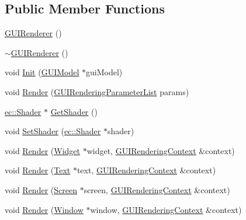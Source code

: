 \subsection*{Public Member Functions}
\begin{DoxyCompactItemize}
\item 
\mbox{\hyperlink{classec__gui_1_1_g_u_i_renderer_ae4a4377643f0c1779ca5eb235d28c6d6}{G\+U\+I\+Renderer}} ()
\item 
\mbox{\hyperlink{classec__gui_1_1_g_u_i_renderer_a91a3b6556e43f46fbb331004a6c2bd6a}{$\sim$\+G\+U\+I\+Renderer}} ()
\item 
void \mbox{\hyperlink{classec__gui_1_1_g_u_i_renderer_acc450ad133730bae2e9cc39bf5565a63}{Init}} (\mbox{\hyperlink{classec__gui_1_1_g_u_i_model}{G\+U\+I\+Model}} $\ast$gui\+Model)
\item 
void \mbox{\hyperlink{classec__gui_1_1_g_u_i_renderer_a92e0ffad2a4d6f749f764af78f6965d6}{Render}} (\mbox{\hyperlink{structec__gui_1_1_g_u_i_rendering_parameter_list}{G\+U\+I\+Rendering\+Parameter\+List}} params)
\item 
\mbox{\hyperlink{classec_1_1_shader}{ec\+::\+Shader}} $\ast$ \mbox{\hyperlink{classec__gui_1_1_g_u_i_renderer_a3a76769e5dd89331afb899cb7c595883}{Get\+Shader}} ()
\item 
void \mbox{\hyperlink{classec__gui_1_1_g_u_i_renderer_a12195634fd49c0475ee798cdb1d474c0}{Set\+Shader}} (\mbox{\hyperlink{classec_1_1_shader}{ec\+::\+Shader}} $\ast$shader)
\item 
void \mbox{\hyperlink{classec__gui_1_1_g_u_i_renderer_a31787542322b95eecabed8b90e3e0912}{Render}} (\mbox{\hyperlink{classec__gui_1_1_widget}{Widget}} $\ast$widget, \mbox{\hyperlink{classec__gui_1_1_g_u_i_rendering_context}{G\+U\+I\+Rendering\+Context}} \&context)
\item 
void \mbox{\hyperlink{classec__gui_1_1_g_u_i_renderer_a2ad73d19b7af31b597db4ab8cc752b00}{Render}} (\mbox{\hyperlink{classec__gui_1_1_text}{Text}} $\ast$text, \mbox{\hyperlink{classec__gui_1_1_g_u_i_rendering_context}{G\+U\+I\+Rendering\+Context}} \&context)
\item 
void \mbox{\hyperlink{classec__gui_1_1_g_u_i_renderer_a872a3670396e8eb20858e5e2396889a6}{Render}} (\mbox{\hyperlink{classec__gui_1_1_screen}{Screen}} $\ast$screen, \mbox{\hyperlink{classec__gui_1_1_g_u_i_rendering_context}{G\+U\+I\+Rendering\+Context}} \&context)
\item 
void \mbox{\hyperlink{classec__gui_1_1_g_u_i_renderer_a653246abd1cd356545cce1db75b0ed9c}{Render}} (\mbox{\hyperlink{classec__gui_1_1_window}{Window}} $\ast$window, \mbox{\hyperlink{classec__gui_1_1_g_u_i_rendering_context}{G\+U\+I\+Rendering\+Context}} \&context)
\end{DoxyCompactItemize}


